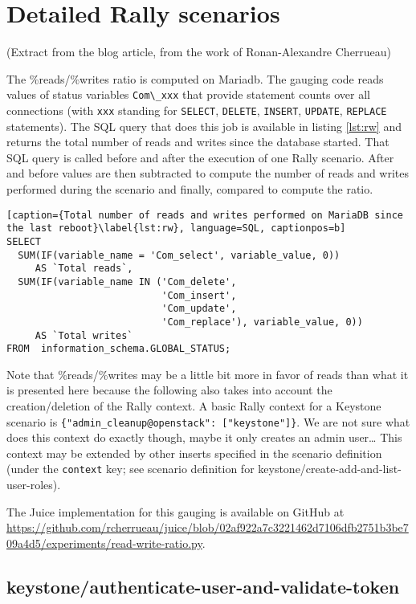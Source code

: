

\section{Detailed Rally scenarios}
\label{sec:detail-rally}

(Extract from the blog article, from the work of Ronan-Alexandre Cherrueau)

The \%reads/\%writes ratio is computed on Mariadb. The gauging code reads values of status variables \verb+Com\_xxx+ that provide statement counts over all connections (with \verb+xxx+ standing for \verb+SELECT+, \verb+DELETE+, \verb+INSERT+, \verb+UPDATE+, \verb+REPLACE+ statements). The SQL query that does this job is available in listing \ref{lst:rw} and returns the total number of reads and writes since the database started. That SQL query is called before and after the execution of one Rally scenario. After and before values are then subtracted to compute the number of reads and writes performed during the scenario and finally, compared to compute the ratio.

\begin{lstlisting}[caption={Total number of reads and writes performed on MariaDB since the last reboot}\label{lst:rw}, language=SQL, captionpos=b]
SELECT
  SUM(IF(variable_name = 'Com_select', variable_value, 0))
     AS `Total reads`,
  SUM(IF(variable_name IN ('Com_delete',
                           'Com_insert',
                           'Com_update',
                           'Com_replace'), variable_value, 0))
     AS `Total writes`
FROM  information_schema.GLOBAL_STATUS;
\end{lstlisting}

Note that \%reads/\%writes may be a little bit more in favor of reads than what it is presented here because the following also takes into account the creation/deletion of the Rally context. A basic Rally context for a Keystone scenario is \verb+{"admin_cleanup@openstack": ["keystone"]}+. We are not sure what does this context do exactly though, maybe it only creates an admin user… This context may be extended by other inserts specified in the scenario definition (under the \verb+context+ key; see scenario definition for keystone/create-add-and-list-user-roles).

The Juice implementation for this gauging is available on GitHub at \url{https://github.com/rcherrueau/juice/blob/02af922a7c3221462d7106dfb2751b3be709a4d5/experiments/read-write-ratio.py}.


\subsection{keystone/authenticate-user-and-validate-token}

